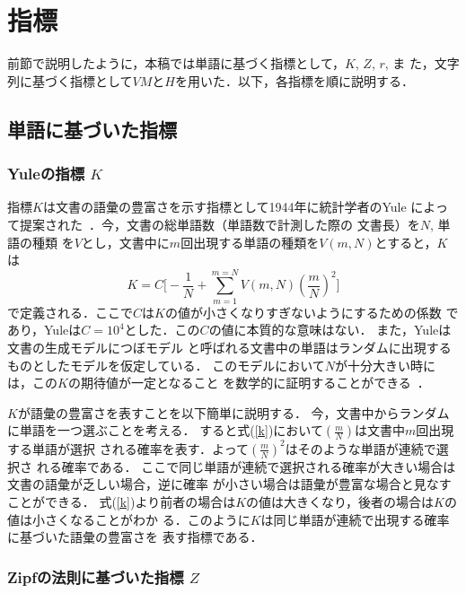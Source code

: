 \documentclass[japanese]{jnlp_JS2.0}
\begin{document}
\section{指標} 
\label{sihyou}

前節で説明したように，本稿では単語に基づく指標として，$K$, $Z$, $r$, ま
た，文字列に基づく指標として$\mathit{VM}$と$H$を用いた．以下，各指標を順に説明する．


\subsection{単語に基づいた指標}
  
\subsubsection*{Yuleの指標 $K$}

指標$K$は文書の語彙の豊富さを示す指標として1944年に統計学者のYule
によって提案された~\cite{Yule}．今，文書の総単語数（単語数で計測した際の
文書長）を$N$, 単語の種類
を$V$とし，文書中に$m$回出現する単語の種類を$V(m,N)$とすると，$K$は
\begin{equation}
K = C\Big[-\frac{1}{N}+{\sum_{m=1}^{m=N}V(m, N)\left(\frac{m}{N}\right)^2}\Big] 
\label{k}
\end{equation}
で定義される．ここで$C$は$K$の値が小さくなりすぎないようにするための係数
であり，Yuleは$C=10^{4}$とした．この$C$の値に本質的な意味はない．
また，Yuleは文書の生成モデルにつぼモデル
と呼ばれる文書中の単語はランダムに出現するものとしたモデルを仮定している．
このモデルにおいて$N$が十分大きい時には，この$K$の期待値が一定となること
を数学的に証明することができる~\cite{Baayen}．

$K$が語彙の豊富さを表すことを以下簡単に説明する． 
今，文書中からランダムに単語を一つ選ぶことを考える．
すると式(\ref{k})において$(\frac{m}{N})$は文書中$m$回出現する単語が選択
される確率を表す．よって$(\frac{m}{N})^2$はそのような単語が連続で選択さ
れる確率である．
ここで同じ単語が連続で選択される確率が大きい場合は文書の語彙が乏しい場合，逆に確率
が小さい場合は語彙が豊富な場合と見なすことができる．
式(\ref{k})より前者の場合は$K$の値は大きくなり，後者の場合は$K$の値は小さくなることがわか
る．このように$K$は同じ単語が連続で出現する確率に基づいた語彙の豊富さを
表す指標である．
  

\subsubsection*{Zipfの法則に基づいた指標 $Z$}\label{zipf}
\end{document}
